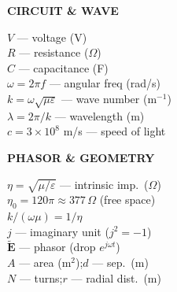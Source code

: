 \documentclass[6pt,letterpaper]{article}
\newcommand{\shead}[3]{%
  \noindent\colorbox{#1}{\parbox{\dimexpr\linewidth-2\fboxsep\relax}%
  {\color{#2}\bfseries\fontsize{6}{7}\selectfont #3}}\vspace{0.5pt}}
\begin{document}
\begin{minipage}[t]{0.19\linewidth}
\shead{bluebg}{blue}{CIRCUIT \& WAVE}
\begin{ebox}
$V$ — voltage (V)\\
$R$ — resistance ($\Omega$)\\
$C$ — capacitance (F)\\
$\omega=2\pi f$ — angular freq (rad/s)\\
$k=\omega\sqrt{\mu\varepsilon}$ — wave number (m$^{-1}$)\\
$\lambda=2\pi/k$ — wavelength (m)\\
$c=3\!\times\!10^8$ m/s — speed of light
\end{ebox}
\end{minipage}\hfill
\begin{minipage}[t]{0.19\linewidth}
\shead{pinkbg}{pink}{PHASOR \& GEOMETRY}
\begin{ebox}
$\eta=\sqrt{\mu/\varepsilon}$ — intrinsic imp.\ ($\Omega$)\\
$\eta_0=120\pi\approx377\,\Omega$ (free space)\\
$k/(\omega\mu)=1/\eta$\\
$j$ — imaginary unit ($j^2=-1$)\\
$\tilde{\mathbf{E}}$ — phasor (drop $e^{j\omega t}$)\\[2pt]
$A$ — area (m$^2$);\quad $d$ — sep.\ (m)\\
$N$ — turns;\quad $r$ — radial dist.\ (m)
\end{ebox}
\end{minipage}

\newpage
\end{document}
